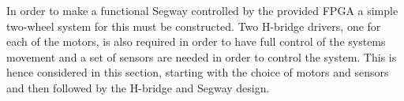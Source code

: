 In order to make a functional Segway controlled by the provided FPGA a simple two-wheel system for this must be constructed.
Two H-bridge drivers, one for each of the motors, is also required in order to have full control of the systems movement and a set of sensors are needed in order to control the system.
This is hence considered in this section, starting with the choice of motors and sensors and then followed by the H-bridge and Segway design.